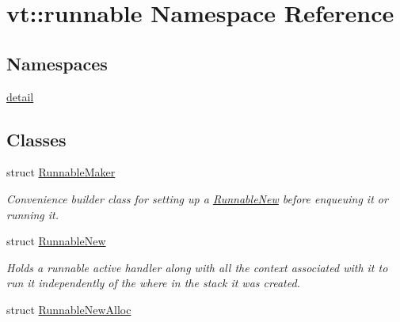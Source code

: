 \hypertarget{namespacevt_1_1runnable}{}\section{vt\+:\+:runnable Namespace Reference}
\label{namespacevt_1_1runnable}
\subsection*{Namespaces}
\begin{DoxyCompactItemize}
\item 
 \hyperlink{namespacevt_1_1runnable_1_1detail}{detail}
\end{DoxyCompactItemize}
\subsection*{Classes}
\begin{DoxyCompactItemize}
\item 
struct \hyperlink{structvt_1_1runnable_1_1_runnable_maker}{Runnable\+Maker}
\begin{DoxyCompactList}\small\item\em Convenience builder class for setting up a {\ttfamily \hyperlink{structvt_1_1runnable_1_1_runnable_new}{Runnable\+New}} before enqueuing it or running it. \end{DoxyCompactList}\item 
struct \hyperlink{structvt_1_1runnable_1_1_runnable_new}{Runnable\+New}
\begin{DoxyCompactList}\small\item\em Holds a runnable active handler along with all the context associated with it to run it independently of the where in the stack it was created. \end{DoxyCompactList}\item 
struct \hyperlink{structvt_1_1runnable_1_1_runnable_new_alloc}{Runnable\+New\+Alloc}
\end{DoxyCompactItemize}
